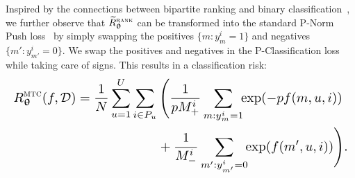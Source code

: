 

Inspired by the connections between bipartite ranking and binary classification~\cite{ertekin2011equivalence,menon2016bipartite},
we further observe that $\widetilde R_{{\bm{\uptheta}}}^{\textsc{rank}}$ can be transformed into the standard P-Norm Push loss~\cite{rudin2009p} 
by simply swapping the positives {\small $\{m: y_m^i = 1\}$} and negatives {\small $\{m': y_{m'}^i = 0\}$}. %
We swap the positives and negatives in the P-Classification loss~\cite{ertekin2011equivalence} while taking care of signs.
This results in a classification risk:
\begin{equation}
\label{eq:clfrisk}
\resizebox{\columnwidth}{!}{$\displaystyle
\begin{aligned}
R_{\upthetabm}^{\textsc{mtc}}(f, \DCal)
= \frac{1}{N} \sum_{u=1}^U 
& \sum_{i \in P_u} \Bigg(
  \frac{1}{p M_+^i} \sum_{m: y_m^i = 1} \!\! \exp(-p f(m, u, i)) \\
& \hspace{2em}  + \frac{1}{M_-^i} \sum_{m': y_{m'}^i = 0} \!\! \exp(f(m', u, i)) \Bigg).
\end{aligned}
$}
\end{equation}



